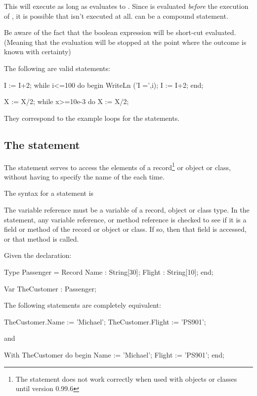 \documentclass{report}
\begin{document}
This will execute  as long as  evaluates to
. Since  is evaluated {\em before} the execution
of , it is possible that  isn't executed at
all.  can be a compound statement.

Be aware of the fact that the boolean expression  will be 
short-cut evaluated. (Meaning that the evaluation will be stopped at the 
point where the outcome is known with certainty)

The following are valid  statements:
\begin{listing}
I := I+2;
while i<=100 do
  begin
  WriteLn ('I =',i);
  I := I+2;
  end;

X := X/2;
while x>=10e-3 do
  X := X/2;
\end{listing}
They correspond to the example loops for the  statements.

\subsection{The  statement}
\label{se:With}

The  statement serves to access the elements of a record\footnote{
The  statement does not work correctly when used with 
objects or classes until version 0.99.6}
or object or class, without having to specify the name of the each time. 

The syntax for a  statement is



The variable reference must be a variable of a record, object or class type.
In the  statement, any variable reference, or method reference is
checked to see if it is a field or method of the record or object or class.
If so, then that field is accessed, or that method is called.


Given the declaration:
\begin{listing}
Type Passenger = Record
       Name : String[30];
       Flight : String[10];
       end;

Var TheCustomer : Passenger;
\end{listing}
The following statements are completely equivalent:
\begin{listing}
TheCustomer.Name := 'Michael';
TheCustomer.Flight := 'PS901';
\end{listing}
and
\begin{listing}
With TheCustomer do
  begin
  Name := 'Michael';
  Flight := 'PS901';
  end;
\end{listing}
\end{document}
